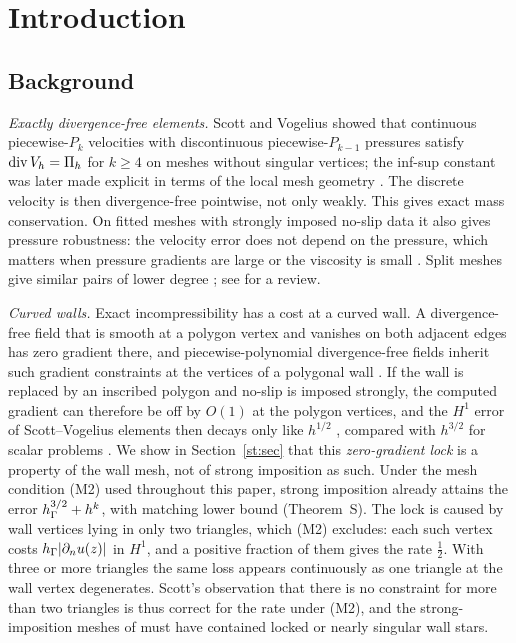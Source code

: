 \section{Introduction}\label{sec:intro}

\subsection*{Background}
\emph{Exactly divergence-free elements.} Scott and Vogelius \cite{ScottVogelius1985} showed that continuous piecewise-$P_k$ velocities with discontinuous piecewise-$P_{k-1}$ pressures satisfy $\operatorname{div}V_h=\Pi_h$ for $k\ge4$ on meshes without singular vertices; the inf-sup constant was later made explicit in terms of the local mesh geometry \cite{GuzmanScott2019}. The discrete velocity is then divergence-free pointwise, not only weakly. This gives exact mass conservation. On fitted meshes with strongly imposed no-slip data it also gives pressure robustness: the velocity error does not depend on the pressure, which matters when pressure gradients are large or the viscosity is small \cite{JohnEtAl2017}. Split meshes give similar pairs of lower degree \cite{GuzmanNeilan2018}; see \cite{Neilan2020} for a review.

\emph{Curved walls.} Exact incompressibility has a cost at a curved wall. A divergence-free field that is smooth at a polygon vertex and vanishes on both adjacent edges has zero gradient there, and piecewise-polynomial divergence-free fields inherit such gradient constraints at the vertices of a polygonal wall \cite{ScottPrize,GjerdeScott2024}. If the wall is replaced by an inscribed polygon and no-slip is imposed strongly, the computed gradient can therefore be off by $O(1)$ at the polygon vertices, and the $H^1$ error of Scott--Vogelius elements then decays only like $h^{1/2}$ \cite{ScottPrize,GjerdeScott2024}, compared with $h^{3/2}$ for scalar problems \cite{BergerScottStrang1972,Scott1975}. We show in Section~\ref{st:sec} that this \emph{zero-gradient lock} is a property of the wall mesh, not of strong imposition as such. Under the mesh condition (M2) used throughout this paper, strong imposition already attains the error $h_\Gamma^{3/2}+h^k$, with matching lower bound (Theorem~S). The lock is caused by wall vertices lying in only two triangles, which (M2) excludes: each such vertex costs $h_\Gamma|\partial_n u(z)|$ in $H^1$, and a positive fraction of them gives the rate $\frac12$. With three or more triangles the same loss appears continuously as one triangle at the wall vertex degenerates. Scott's observation that there is no constraint for more than two triangles \cite{ScottPrize} is thus correct for the rate under (M2), and the strong-imposition meshes of \cite{GjerdeScott2024} must have contained locked or nearly singular wall stars.

